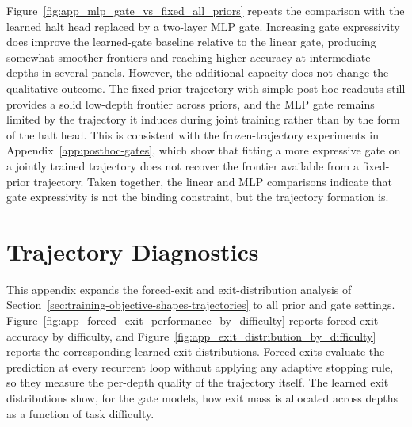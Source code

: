\documentclass[10pt]{article} %
\begin{document}
Figure~\ref{fig:app_mlp_gate_vs_fixed_all_priors} repeats the comparison with the learned halt head replaced by a two-layer MLP gate. Increasing gate expressivity does improve the learned-gate baseline relative to the linear gate, producing somewhat smoother frontiers and reaching higher accuracy at intermediate depths in several panels. However, the additional capacity does not change the qualitative outcome. The fixed-prior trajectory with simple post-hoc readouts still provides a solid low-depth frontier across priors, and the MLP gate remains limited by the trajectory it induces during joint training rather than by the form of the halt head. This is consistent with the frozen-trajectory experiments in Appendix~\ref{app:posthoc-gates}, which show that fitting a more expressive gate on a jointly trained trajectory does not recover the frontier available from a fixed-prior trajectory. Taken together, the linear and MLP comparisons indicate that gate expressivity is not the binding constraint, but the trajectory formation is.

\section{Trajectory Diagnostics}
\label{app:forced_exit_all}

This appendix expands the forced-exit and exit-distribution analysis of Section~\ref{sec:training-objective-shapes-trajectories} to all prior and gate settings. Figure~\ref{fig:app_forced_exit_performance_by_difficulty} reports forced-exit accuracy by difficulty, and Figure~\ref{fig:app_exit_distribution_by_difficulty} reports the corresponding learned exit distributions. Forced exits evaluate the prediction at every recurrent loop without applying any adaptive stopping rule, so they measure the per-depth quality of the trajectory itself. The learned exit distributions show, for the gate models, how exit mass is allocated across depths as a function of task difficulty.
\end{document}
